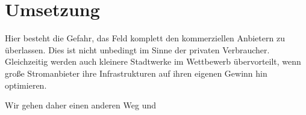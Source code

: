 
\section{Umsetzung}\label{sec:umsetzung}

Hier besteht die Gefahr, das Feld komplett den kommerziellen Anbietern
zu überlassen. Dies ist nicht unbedingt im Sinne der privaten
Verbraucher. Gleichzeitig werden auch kleinere Stadtwerke im Wettbewerb
übervorteilt, wenn große Stromanbieter ihre Infrastrukturen auf ihren
eigenen Gewinn hin optimieren. 

Wir gehen daher einen anderen Weg und 
